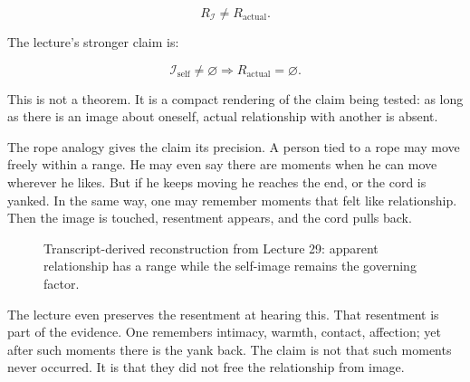 \documentclass[11pt,oneside]{book}
\begin{document}
\begin{equation}
R_{\mathcal{I}} \neq R_{\text{actual}}.
\end{equation}

The lecture's stronger claim is:

\begin{equation}
\mathcal{I}_{\text{self}} \neq \varnothing
\Longrightarrow
R_{\text{actual}} = \varnothing.
\end{equation}

This is not a theorem. It is a compact rendering of the claim being tested: as long as there is an image about oneself, actual relationship with another is absent.

The rope analogy gives the claim its precision. A person tied to a rope may move freely within a range. He may even say there are moments when he can move wherever he likes. But if he keeps moving he reaches the end, or the cord is yanked. In the same way, one may remember moments that felt like relationship. Then the image is touched, resentment appears, and the cord pulls back.

\begin{figure}
\centering
{}
\caption{Transcript-derived reconstruction from Lecture 29: apparent relationship has a range while the self-image remains the governing factor.}
\end{figure}

The lecture even preserves the resentment at hearing this. That resentment is part of the evidence. One remembers intimacy, warmth, contact, affection; yet after such moments there is the yank back. The claim is not that such moments never occurred. It is that they did not free the relationship from image.
\end{document}
